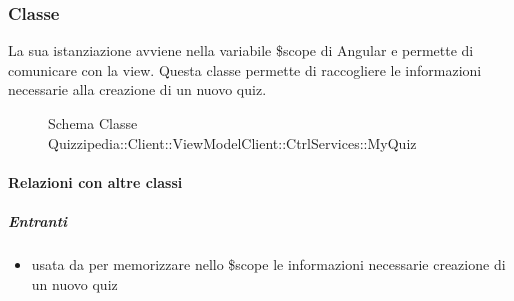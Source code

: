 \subsubsection{Classe }
La sua istanziazione avviene nella variabile \$scope di Angular e permette di comunicare con la view. Questa classe permette di raccogliere le informazioni necessarie alla creazione di un nuovo quiz.
\begin{figure}[H]
\centering
\noindent{}
\caption[Schema Classe MyQuiz]{Schema Classe Quizzipedia::Client::ViewModelClient::CtrlServices::MyQuiz}
\end{figure}
\paragraph{Relazioni con altre classi}
\subparagraph{Entranti}
\begin{itemize}
\item usata da  per memorizzare nello \$scope le informazioni necessarie creazione di un nuovo quiz
\end{itemize}
